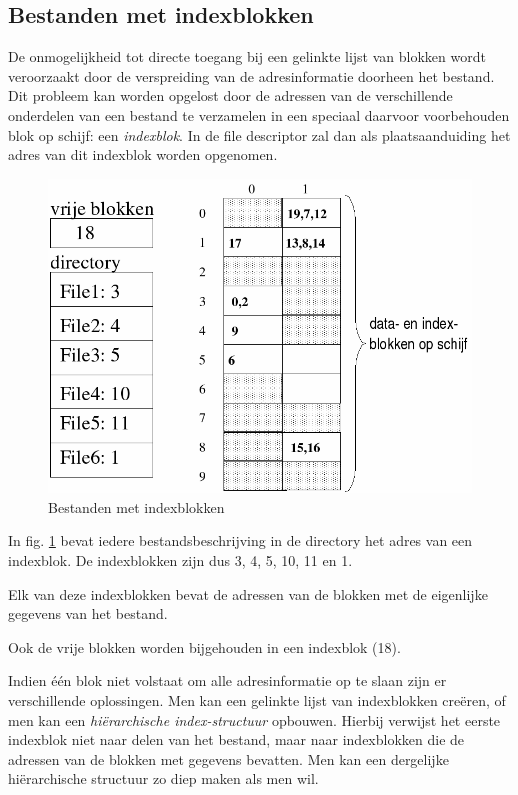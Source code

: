 \subsection{Bestanden met indexblokken}

De onmogelijkheid tot directe toegang bij een gelinkte lijst van
blokken wordt veroorzaakt door de verspreiding van de adresinformatie
doorheen het bestand. Dit probleem kan worden opgelost door de
adressen van de verschillende onderdelen van een bestand te verzamelen
in een speciaal daarvoor voorbehouden blok op schijf: een
\emph{indexblok}. In de file descriptor zal dan als
plaatsaanduiding het adres van dit indexblok worden opgenomen.

\begin{figure}
\begin{center}
\includegraphics[width=120mm]{images/fig0411.png}
\caption{Bestanden met indexblokken}
\label{indexblokken}
\end{center}
\end{figure}

In fig. \ref{indexblokken} bevat iedere bestandsbeschrijving in de
directory het adres van een indexblok. De indexblokken zijn dus 3, 4,
5, 10, 11 en 1.

Elk van deze indexblokken bevat de adressen van de blokken met
de eigenlijke gegevens van het bestand.

Ook de vrije blokken worden bijgehouden in een indexblok
(18).

Indien \'e\'en blok niet volstaat om alle adresinformatie op te
slaan zijn er verschillende oplossingen. Men kan een gelinkte lijst
van indexblokken cre\"eren, of men kan een \emph{hi\"erarchische
index-structuur} opbouwen. Hierbij verwijst het eerste
indexblok niet naar delen van het bestand, maar naar indexblokken die
de adressen van de blokken met gegevens bevatten. Men kan een
dergelijke hi\"erarchische structuur zo diep maken als men wil.

